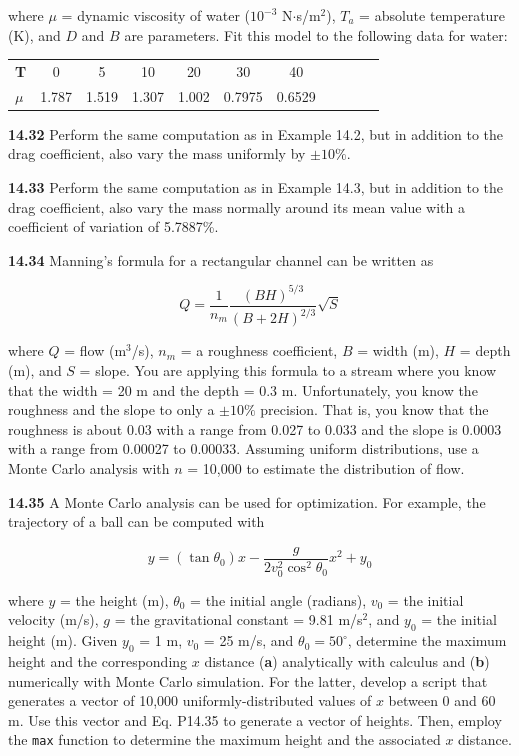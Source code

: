 \documentclass[../main.tex]{subfiles}
\begin{document}
\begin{multicols}{2}
	\noindent where $\mu$ = dynamic viscosity of water ($10^{-3}$ N$\cdot$s/m$^2$), $T_a$ = absolute temperature (K), and $D$ and $B$ are parameters. Fit this model to the following data for water:

	\noindent \begin{tabular}{l c c c c c c c c c c}
		\textbf{T} & 0 & 5 & 10 & 20 & 30 & 40 \\
		\textbf{$\mu$} & 1.787 & 1.519 & 1.307 & 1.002 & 0.7975 & 0.6529
	\end{tabular}

	\noindent\textbf{14.32} Perform the same computation as in Example 14.2,
	but in addition to the drag coefficient, also vary the mass
	uniformly by $\pm 10\%$.

	\noindent\textbf{14.33} Perform the same computation as in Example 14.3,
	but in addition to the drag coefficient, also vary the mass
	normally around its mean value with a coefficient of variation of 5.7887\%.

	\noindent\textbf{14.34}  Manning's formula for a rectangular channel can be
	written as

	$$Q = \frac{1}{n_m} \frac{(BH) ^ {5/3}}{(B+2H) ^ {2/3}} \sqrt{S}$$

	\noindent where $Q$ = flow (m$^3$/s), $n_m$ = a roughness coefficient, $B$ =
	width (m), $H$ = depth (m), and $S$ = slope. You are applying
	this formula to a stream where you know that the width = 20 m
	and the depth = 0.3 m. Unfortunately, you know the roughness and the slope to only a $\pm 10\%$ precision. That is, you
	know that the roughness is about 0.03 with a range from 0.027
	to 0.033 and the slope is 0.0003 with a range from 0.00027
	to 0.00033. Assuming uniform distributions, use a Monte
	Carlo analysis with $n$ = 10,000 to estimate the distribution
	of flow.

	\noindent\textbf{14.35} A Monte Carlo analysis can be used for optimization.
	For example, the trajectory of a ball can be computed with

	\begin{equation}
		\tag{P14.35}
		y = (\tan \theta_0)x - \frac{g}{2 v^2_0 \cos ^2 \theta_0} x^2 + y_0
	\end{equation}

	\noindent where $y$ = the height (m), $\theta_0$ = the initial angle (radians),
	$v_0$ = the initial velocity (m/s), $g$ = the gravitational constant =
	9.81 m/s$^2$, and $y_0$ = the initial height (m). Given $y_0$ = 1 m,
	$v_0$ = 25 m/s, and $\theta_0 = 50^\circ$, determine the maximum height
	and the corresponding $x$ distance (\textbf{a}) analytically with calculus and (\textbf{b}) numerically with Monte Carlo simulation. For
	the latter, develop a script that generates a vector of 10,000
	uniformly-distributed values of $x$ between 0 and 60 m. Use
	this vector and Eq. P14.35 to generate a vector of heights.
	Then, employ the \texttt{max} function to determine the maximum
	height and the associated $x$ distance.
\end{multicols}
\end{document}
